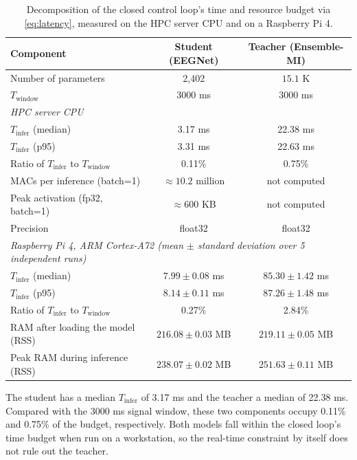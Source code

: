 \begin{table}[!htbp]
\centering
\caption{Decomposition of the closed control loop's time and
resource budget via \eqref{eq:latency}, measured on the HPC server
CPU and on a Raspberry Pi 4.}
\label{tab:tre}
\begin{tabular}{lcc}
\toprule
\textbf{Component} & \textbf{Student (EEGNet)} & \textbf{Teacher (Ensemble-MI)} \\
\midrule
Number of parameters & 2,402 & $15.1$ K \\
$T_{\mathrm{window}}$ & 3000 ms & 3000 ms \\
\midrule
\multicolumn{3}{l}{\textit{HPC server CPU}} \\
$T_{\mathrm{infer}}$ (median) & 3.17 ms & 22.38 ms \\
$T_{\mathrm{infer}}$ (p95) & 3.31 ms & 22.63 ms \\
Ratio of $T_{\mathrm{infer}}$ to $T_{\mathrm{window}}$ & 0.11\% & 0.75\% \\
MACs per inference (batch=1) & $\approx 10.2$ million & not computed \\
Peak activation (fp32, batch=1) & $\approx 600$ KB & not computed \\
Precision & float32 & float32 \\
\midrule
\multicolumn{3}{l}{\textit{Raspberry Pi 4, ARM Cortex-A72 (mean
$\pm$ standard deviation over 5 independent runs)}} \\
$T_{\mathrm{infer}}$ (median) & $7.99 \pm 0.08$ ms & $85.30 \pm 1.42$ ms \\
$T_{\mathrm{infer}}$ (p95) & $8.14 \pm 0.11$ ms & $87.26 \pm 1.48$ ms \\
Ratio of $T_{\mathrm{infer}}$ to $T_{\mathrm{window}}$ & 0.27\% & 2.84\% \\
RAM after loading the model (RSS) & $216.08 \pm 0.03$ MB & $219.11 \pm 0.05$ MB \\
Peak RAM during inference (RSS) & $238.07 \pm 0.02$ MB & $251.63 \pm 0.11$ MB \\
\bottomrule
\end{tabular}
\end{table}
\FloatBarrier

The student has a median
$T_{\mathrm{infer}}$ of 3.17 ms and the teacher a median of 22.38
ms. Compared with the 3000 ms signal window, these two components
occupy 0.11\% and 0.75\% of the budget, respectively. Both models
fall within the closed loop's time budget when run on a workstation,
so the real-time constraint by itself does not rule out the teacher.

